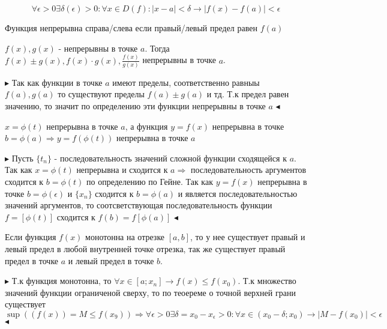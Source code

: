 \documentclass[14pt]{extreport}
\begin{document}
        \begin{definition}
            $$\forall \epsilon > 0 \exists \delta(\epsilon) > 0 : \forall x \in D(f): |x-a| < \delta \rightarrow |f(x) - f(a)| < \epsilon$$
        \end{definition}

        \begin{definition}
            Функция непрерывна справа/слева если правый/левый предел равен $f(a)$
        \end{definition}

        \begin{theorem}
            $f(x), g(x)$ - непрерывны в точке $a$. Тогда $f(x) \pm g(x), f(x) \cdot g(x), \frac{f(x)}{g(x)}$ непрерывны в точке $a$.          
        \end{theorem}

        $\blacktriangleright$ Так как функции в точке $a$ имеют пределы, соответственно равныы $f(a), g(a)$ то существуют пределы $f(a) \pm g(a) $ и тд. Т.к предел равен значению, то значит по определению эти функции непрерывны в точке $a$ $\blacktriangleleft$

        \begin{theorem}
            $x = \phi(t)$ непрерывна в точке $a$, а функция $y=f(x)$ непрерывна в точке $b=\phi(a) \Rightarrow y=f(\phi(t))$ непрерывна в точке $a$
        \end{theorem}

        $\blacktriangleright$
            Пусть $\{t_n\}$ - последовательность значений сложной функции сходящейся к $a$.
            Так как $x=\phi(t)$ непрерывна и сходится к $a \Rightarrow $ последовательность аргументов сходится к $b=\phi(t)$ по определению по Гейне. 
            Так как $y=f(x)$ непрерывна в точке $b=\phi(\epsilon)$ и $\{x_n\}$ сходится к $b=\phi(a)$ и является последовательностью значений аргументов, то соотсветствующая последовательность функции $f=[\phi(t)]$ сходится к $f(b) = f[\phi(a)]$
        $\blacktriangleleft$


        \begin{theorem}
            Если функция $f(x)$ монотонна на отрезке $[a,b]$, то у нее существует правый и левый предел в любой внутренней точке отрезка, так же существует правый предел в точке $a$ и левый предел в точке $b$.
        \end{theorem}
        $\blacktriangleright$
            Т.к функция монотонна, то $\forall x \in [a; x_n] \rightarrow f(x) \leq f(x_0)$. Т.к множество значений функции ограниченой сверху, то по теоереме о точной верхней грани существует $\sup ((f(x)) = M \leq f(x_9)) \Rightarrow \forall \epsilon > 0 \exists \delta = x_0 - x_\epsilon > 0: \forall x \in (x_0 - \delta; x_0) \rightarrow |M - f(x_0)| < \epsilon$
        $\blacktriangleleft$
\end{document}
